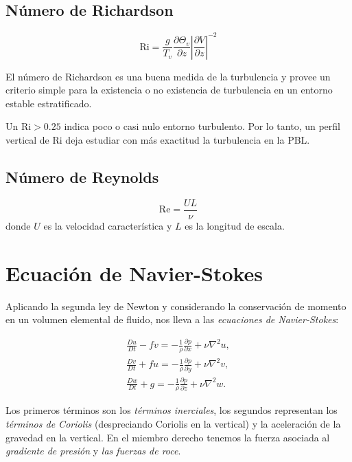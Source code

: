 \documentclass[openany]{book}
\begin{document}
\subsection{Número de Richardson}
\begin{equation}
    \mathrm{Ri}=\frac{g}{T_{v}}\frac{\partial \Theta_{v}}{\partial z}\left|\frac{\partial V}{\partial z}\right|^{-2}
\end{equation}
\par El número de Richardson es una buena medida de la 
turbulencia y provee un criterio simple para la existencia o no 
existencia de turbulencia en un entorno estable estratificado.
\par Un $\mathrm{Ri}>0.25$ indica poco o casi nulo entorno 
turbulento. Por lo tanto, un perfil vertical de $\mathrm{Ri}$ 
deja estudiar con más exactitud la turbulencia en la PBL.

\subsection{Número de Reynolds}
\begin{equation}
    \mathrm{Re}=\frac{UL}{\nu}
\end{equation}
donde $U$ es la velocidad característica y $L$ es la longitud de 
escala.

\section{Ecuación de Navier-Stokes}
Aplicando la segunda ley de Newton y considerando la 
conservación de momento en un volumen elemental de fluido, 
nos lleva a las \emph{ecuaciones de Navier-Stokes}:

\begin{gather}
   \frac{Du}{Dt}-fv=-\frac{1}{\rho}\frac{\partial p}{\partial x}+\nu\nabla^{2}u,\\
   \frac{Dv}{Dt}+fu=-\frac{1}{\rho}\frac{\partial p}{\partial y}+\nu\nabla^{2}v,\\
   \frac{Dw}{Dt}+g=-\frac{1}{\rho}\frac{\partial p}{\partial z}+\nu\nabla^{2}w.
\end{gather}

\par Los primeros términos son los \emph{términos inerciales},
 los segundos representan los \emph{términos de Coriolis} 
 (despreciando Coriolis en la vertical) y la aceleración de la 
 gravedad en la vertical. En el miembro derecho tenemos la 
 fuerza asociada al \emph{gradiente de presión} y \emph{las 
 fuerzas de roce}.
\end{document}
